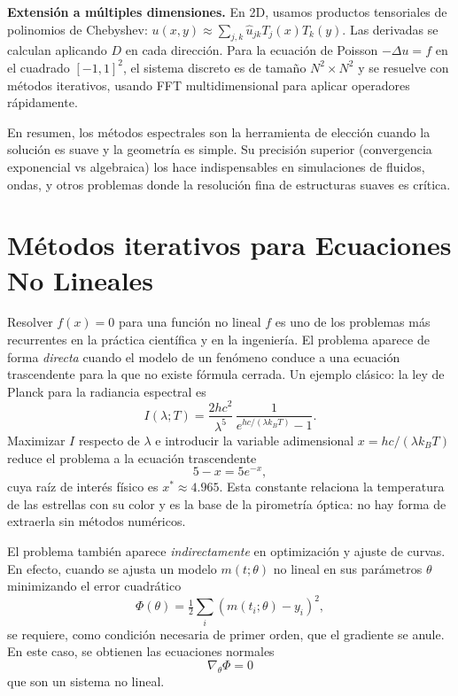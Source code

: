 \documentclass[a4paper,11pt]{report}
\begin{document}
\textbf{Extensión a múltiples dimensiones.} En 2D, usamos productos tensoriales de polinomios de Chebyshev: $u(x,y) \approx \sum_{j,k} \hat{u}_{jk} T_j(x) T_k(y)$. Las derivadas se calculan aplicando $D$ en cada dirección. Para la ecuación de Poisson $-\Delta u = f$ en el cuadrado $[-1,1]^2$, el sistema discreto es de tamaño $N^2 \times N^2$ y se resuelve con métodos iterativos, usando FFT multidimensional para aplicar operadores rápidamente.

En resumen, los métodos espectrales son la herramienta de elección cuando la solución es suave y la geometría es simple. Su precisión superior (convergencia exponencial vs algebraica) los hace indispensables en simulaciones de fluidos, ondas, y otros problemas donde la resolución fina de estructuras suaves es crítica.


\fi
\chapter{Métodos iterativos para Ecuaciones No Lineales}

Resolver $f(x)=0$ para una función no lineal $f$ es uno de los problemas más
recurrentes en la práctica científica y en la ingeniería.
El problema aparece de forma \emph{directa} cuando el modelo de un fenómeno conduce
a una ecuación trascendente para la que no existe fórmula cerrada.
Un ejemplo clásico: la ley de Planck para la radiancia espectral es
\[
I(\lambda;T)=\frac{2hc^2}{\lambda^5}\,\frac{1}{e^{hc/(\lambda k_B T)}-1}.
\]
Maximizar $I$ respecto de $\lambda$ e introducir la variable adimensional
$x=hc/(\lambda k_B T)$ reduce el problema a la ecuación trascendente
\[
5-x=5e^{-x},
\]
cuya raíz de interés físico es $x^*\approx 4.965$.
Esta constante relaciona la temperatura de las estrellas con su color
y es la base de la pirometría óptica: no hay forma de extraerla sin métodos numéricos.

El problema también aparece \emph{indirectamente} en optimización y ajuste de curvas. En efecto, cuando se ajusta un modelo $m(t;\theta)$ no lineal en sus parámetros $\theta$ minimizando el error cuadrático
$$\Phi(\theta)=\tfrac12\sum_i(m(t_i;\theta)-y_i)^2,$$
se requiere, como condición necesaria de primer orden, que el gradiente se anule. En este caso, se obtienen las ecuaciones normales 
$$\nabla_\theta\Phi=0$$ 
que son un sistema no lineal. 
\end{document}
